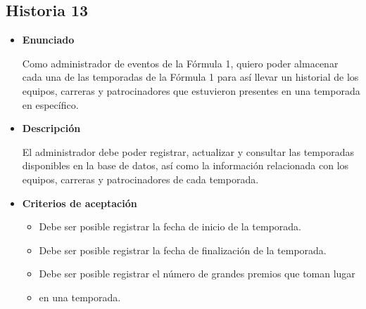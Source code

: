 \documentclass{article}
\begin{document}
	\subsection{Historia 13}
	\begin{itemize}
		
		\item \large{\textbf{Enunciado}}
		\begin{description}
			Como administrador de eventos de la Fórmula 1, quiero poder almacenar cada una de las temporadas de la Fórmula 1 para así llevar un historial de los equipos, carreras y patrocinadores que estuvieron presentes en una temporada en específico.
			
		\end{description}
		
		\item \large{\textbf{Descripción}}
		\begin{description}
			El administrador debe poder registrar, actualizar y consultar las temporadas disponibles en la base de datos, así como la información relacionada con los equipos, carreras y patrocinadores de cada temporada.
			
		\end{description}
		
		\item \large{\textbf{Criterios de aceptación}}
		\begin{itemize}
			\item Debe ser posible registrar la fecha de inicio de la temporada.
			\item Debe ser posible registrar la fecha de finalización de la temporada.
			\item Debe ser posible registrar el número de grandes premios que toman lugar \item en una temporada.
			
		\end{itemize}
		
	\end{itemize}
	
\end{document}
